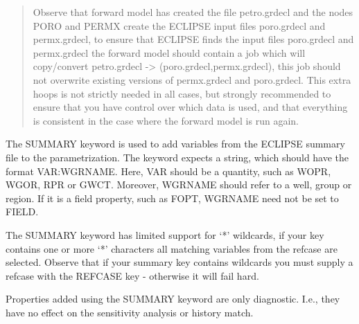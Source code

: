 \documentclass[a4paper,10pt,english]{sphinxmanual}
\begin{document}
\begin{sphinxShadowBox}
\begin{quote}
Observe that forward model has created the file petro.grdecl and the nodes
PORO and PERMX create the ECLIPSE input files poro.grdecl and permx.grdecl, to
ensure that ECLIPSE finds the input files poro.grdecl and permx.grdecl the
forward model should contain a job which will copy/convert petro.grdecl -\textgreater{}
(poro.grdecl,permx.grdecl), this job should not overwrite existing versions of
permx.grdecl and poro.grdecl. This extra hoops is not strictly needed in all
cases, but strongly recommended to ensure that you have control over which
data is used, and that everything is consistent in the case where the forward
model is run again.
\end{quote}
\end{sphinxShadowBox}
\label{\detokenize{keywords/index:summary}}
\begin{sphinxShadowBox}

The SUMMARY keyword is used to add variables from the ECLIPSE summary file to
the parametrization. The keyword expects a string, which should have the
format VAR:WGRNAME. Here, VAR should be a quantity, such as WOPR, WGOR, RPR or
GWCT. Moreover, WGRNAME should refer to a well, group or region. If it is a
field property, such as FOPT, WGRNAME need not be set to FIELD.


%
\begin{sphinxVerbatim}[commandchars=\\\{\}]
        
 
 
                     
\end{sphinxVerbatim}

The SUMMARY keyword has limited support for ‘*’ wildcards, if your key
contains one or more ‘*’ characters all matching variables from the refcase
are selected. Observe that if your summary key contains wildcards you must
supply a refcase with the REFCASE key - otherwise it will fail hard.

 Properties added using the SUMMARY keyword are only diagnostic. I.e., they have no effect on the sensitivity analysis or history match.
\end{sphinxShadowBox}
\end{document}
